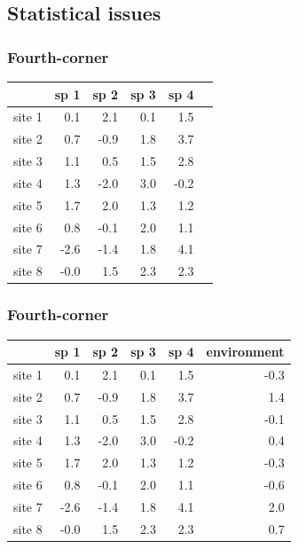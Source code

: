 \documentclass{beamer}
\numberwithin{exercise}{section}
\begin{document}
\subsection{Statistical issues}

\begin{frame}
\frametitle{Fourth-corner}
\small
\begin{table}[ht]
\begin{center}
\begin{tabular}{r|rrrr|r|}
  & sp 1 & sp 2 & sp 3 & sp 4 \\ 
  \hline
site 1 & 0.1 & 2.1 & 0.1 & 1.5  \\ 
  site 2 & 0.7 & -0.9 & 1.8 & 3.7  \\ 
  site 3 & 1.1 & 0.5 & 1.5 & 2.8  \\ 
  site 4 & 1.3 & -2.0 & 3.0 & -0.2  \\ 
  site 5 & 1.7 & 2.0 & 1.3 & 1.2  \\ 
  site 6 & 0.8 & -0.1 & 2.0 & 1.1  \\ 
  site 7 & -2.6 & -1.4 & 1.8 & 4.1  \\ 
  site 8 & -0.0 & 1.5 & 2.3 & 2.3  \\ 
   \hline
\end{tabular}
\end{center}
\end{table}\normalsize
\end{frame}

\begin{frame}
\frametitle{Fourth-corner}
\small
\begin{table}[ht]
\begin{center}
\begin{tabular}{r|rrrr|r|}
  & sp 1 & sp 2 & sp 3 & sp 4 & environment \\ 
  \hline
site 1 & 0.1 & 2.1 & 0.1 & 1.5 & -0.3 \\ 
  site 2 & 0.7 & -0.9 & 1.8 & 3.7 & 1.4 \\ 
  site 3 & 1.1 & 0.5 & 1.5 & 2.8 & -0.1 \\ 
  site 4 & 1.3 & -2.0 & 3.0 & -0.2 & 0.4 \\ 
  site 5 & 1.7 & 2.0 & 1.3 & 1.2 & -0.3 \\ 
  site 6 & 0.8 & -0.1 & 2.0 & 1.1 & -0.6 \\ 
  site 7 & -2.6 & -1.4 & 1.8 & 4.1 & 2.0 \\ 
  site 8 & -0.0 & 1.5 & 2.3 & 2.3 & 0.7 \\ 
   \hline
\end{tabular}
\end{center}
\end{table}\normalsize
\end{frame}
\end{document}
